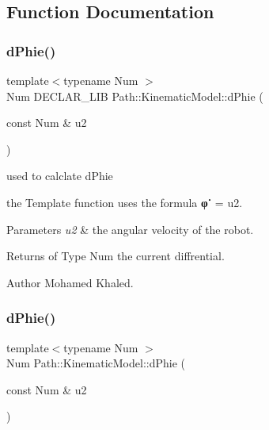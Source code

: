 \subsection{Function Documentation}
\mbox{\label{namespace_path_1_1_kinematic_model_a99891b8ca08d1a54b9dbb88e6f2c5ea8}} 
\subsubsection{\texorpdfstring{d\+Phie()}{dPhie()}\hspace{0.1cm}{\footnotesize\ttfamily [1/2]}}
{\footnotesize\ttfamily template$<$typename Num $>$ \\
Num D\+E\+C\+L\+A\+R\+\_\+\+L\+IB Path\+::\+Kinematic\+Model\+::d\+Phie (\begin{DoxyParamCaption}\item[{const Num \&}]{u2 }\end{DoxyParamCaption})}



used to calclate d\+Phie 

the Template function uses the formula {\bfseries φ˙} = u2. 
\begin{DoxyParams}{Parameters}
{\em u2} & the angular velocity of the robot. \\
\hline
\end{DoxyParams}
\begin{DoxyReturn}{Returns}
of Type Num the current diffrential. 
\end{DoxyReturn}
\begin{DoxyAuthor}{Author}
Mohamed Khaled. 
\end{DoxyAuthor}
\mbox{\label{namespace_path_1_1_kinematic_model_a00319aff5cc6aaf82439c744b6aea60f}} 
\subsubsection{\texorpdfstring{d\+Phie()}{dPhie()}\hspace{0.1cm}{\footnotesize\ttfamily [2/2]}}
{\footnotesize\ttfamily template$<$typename Num $>$ \\
Num Path\+::\+Kinematic\+Model\+::d\+Phie (\begin{DoxyParamCaption}\item[{const Num \&}]{u2 }\end{DoxyParamCaption})}



